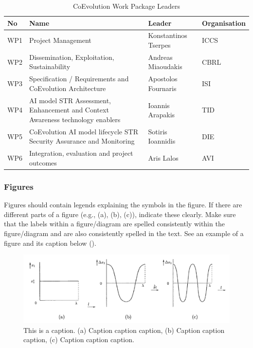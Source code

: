 \begin{table}[htb]
	\centering
	\caption{CoEvolution Work Package Leaders}
	\label{tab:work_package_leaders}
       \begin{tabular}{|l|>{\raggedright}p{6.5cm}|p{3.8cm}|p{2.2cm}|}
		\hline
		\rowcolor{gray!30} %
		No & Name & Leader & Organisation \\
	    \hline
    	     WP1 & Project Management & Konstantinos Tserpes & ICCS  \\ \hline
    	     WP2 & Dissemination, Exploitation, Sustainability  & Andreas Miaoudakis  & CBRL \\ \hline
    	     WP3 & Specification / Requirements and CoEvolution
Architecture & Apostolos Fournaris  & ISI \\ \hline
    	     WP4 & AI model STR Assessment, Enhancement and
Context Awareness technology enablers & Ioannis Arapakis & TID \\ \hline
              WP5 & CoEvolution AI model lifecycle STR Security
Assurance and Monitoring & Sotiris Ioannidis & DIE  \\ \hline
    	     WP6 & Integration, evaluation and project outcomes & Aris Lalos & AVI \\ \hline
	\end{tabular}
\end{table}


\subsubsection{Figures}
\label{sec:figures}

Figures should contain legends explaining the symbols in the figure. If there are different parts of a figure (e.g., (a), (b), (c)), indicate these clearly. Make sure that the labels within a figure/diagram are spelled consistently within the figure/diagram and are also consistently spelled in the text. See an example of a figure and its caption below ().

\begin{figure}[htb]
	\centering
	\includegraphics[width=.89\linewidth]{graphics/figure}
	\caption{This is a caption. (a) Caption caption caption, (b) Caption caption caption, (c) Caption caption caption.}
	\label{fig:figure}
\end{figure}

